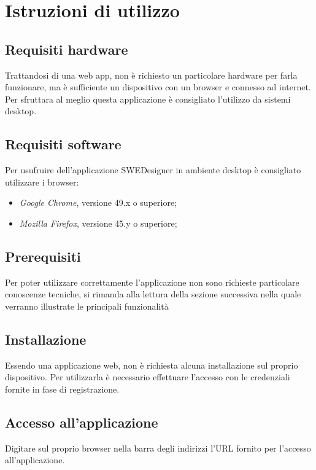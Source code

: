 \section{Istruzioni di utilizzo}
\subsection{Requisiti hardware}
Trattandosi di una web app, non è richiesto un particolare hardware per farla funzionare, ma è sufficiente un dispositivo con un browser e connesso ad internet. Per sfruttara al meglio questa applicazione è consigliato l'utilizzo da sistemi desktop.

\subsection{Requisiti software}
Per usufruire dell'applicazione SWEDesigner in ambiente desktop è consigliato utilizzare i browser:
\begin{itemize}
\item \emph{Google Chrome}, versione 49.x o superiore;
\item \emph{Mozilla Firefox}, versione 45.y o superiore;
\end{itemize}

\subsection{Prerequisiti}
Per poter utilizzare correttamente l'applicazione non sono richieste particolare conoscenze tecniche, si rimanda alla lettura della sezione successiva nella quale verranno illustrate le principali funzionalità

\subsection{Installazione}
Essendo una applicazione web, non è richiesta alcuna installazione sul proprio dispositivo. Per utilizzarla è necessario effettuare l'accesso con le credenziali fornite in fase di registrazione.

\subsection{Accesso all'applicazione}
Digitare sul proprio browser nella barra degli indirizzi l'URL fornito per l'accesso all'applicazione.